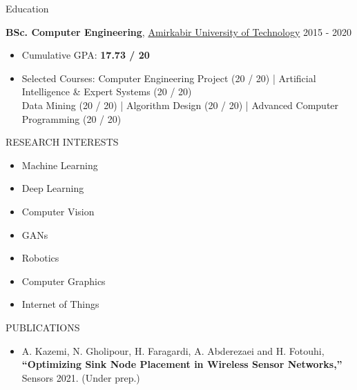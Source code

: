 \documentclass{resume} %
\begin{document}
\begin{rSection}{Education}


{\bf BSc. Computer Engineering}, \href{aut.ac.ir}{Amirkabir University of Technology} \hfill {2015 - 2020}


\begin{itemize}
    \itemsep -3pt {} 
     \item Cumulative GPA: \textbf{17.73 / 20} 
     \item Selected Courses:
	\small{Computer Engineering Project  (20 / 20) | Artificial Intelligence \& Expert Systems (20 / 20)  \\ Data Mining (20 / 20) | Algorithm Design (20 / 20) | Advanced Computer Programming (20 / 20)}
 \end{itemize}

\end{rSection}


\begin{rSection}{RESEARCH INTERESTS}

\begin{multicols}{3}
\begin{itemize}
    \itemsep -3pt {} 
     \item Machine Learning
     \item Deep Learning
     \item Computer Vision
     \item GANs
     \item Robotics
     \item Computer Graphics
     \item Internet of Things
 \end{itemize}
 \end{multicols}

\end{rSection}


\begin{rSection}{PUBLICATIONS}

\begin{itemize}
    \itemsep -3pt {}
    \item A. Kazemi, N. Gholipour, H. Faragardi, A. Abderezaei and H. Fotouhi, \textbf{“Optimizing Sink Node Placement in Wireless Sensor Networks,”} Sensors 2021. (Under prep.)
 \end{itemize}

\end{rSection}
\end{document}
